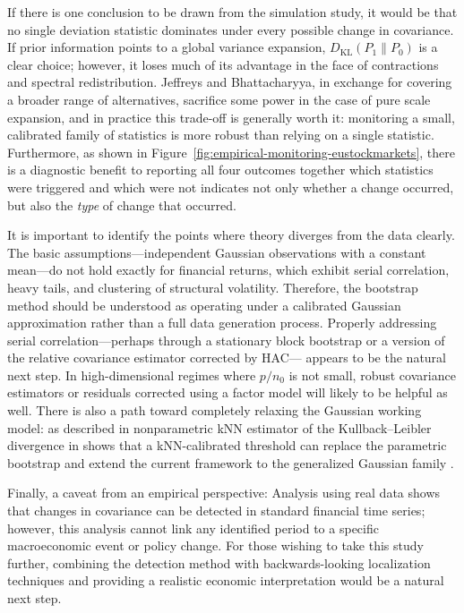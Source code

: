 \documentclass[11pt,a4paper]{article}
\newcommand{\KL}{\mathrm{KL}}
\begin{document}
If there is one conclusion to be drawn from the simulation study, it would be that no
single deviation statistic dominates under every possible change in covariance.
If prior information points to a global variance expansion, $D_{\KL}(P_{1}\|P_{0})$
is a clear choice; however, it loses much of its advantage in the face of
contractions and spectral redistribution. Jeffreys and Bhattacharyya,
in exchange for covering a broader range of alternatives, sacrifice some power
in the case of pure scale expansion, and in practice this trade-off is generally
worth it: monitoring a small, calibrated family of statistics
is more robust than relying on a single statistic. Furthermore,
as shown in Figure~\ref{fig:empirical-monitoring-eustockmarkets},
there is a diagnostic benefit to reporting all four outcomes together which statistics
were triggered and which were not indicates not only whether a change occurred,
but also the \emph{type} of change that occurred.

It is important to identify the points where theory diverges from the data clearly. The basic assumptions—independent Gaussian observations with a constant mean—do not hold exactly for financial returns, which exhibit
serial correlation, heavy tails, and clustering of structural volatility. Therefore, the bootstrap method should be understood as operating under a calibrated Gaussian
approximation rather than a full data generation process. Properly addressing
serial correlation—perhaps through a stationary block bootstrap or
a version of the relative covariance estimator corrected by HAC—
appears to be the natural next step. In high-dimensional regimes where $p/n_{0}$ is not small,
robust covariance estimators or residuals corrected using a factor model will
likely to be helpful as well. There is also a path toward
completely relaxing the Gaussian working model: as described in \citet{cadirci2026kl}
nonparametric kNN estimator of the Kullback–Leibler divergence in \citet{cadirci2026kl}
shows that a kNN-calibrated threshold can replace the parametric bootstrap and
extend the current framework to the generalized Gaussian family
\citep{cadirci2025tsallis}.

Finally, a caveat from an empirical perspective: Analysis using real data
shows that changes in covariance can be detected in standard financial time series; however, this analysis
cannot link any identified period to a specific
macroeconomic event or policy change. For those wishing to take this study further,
combining the detection method with backwards-looking
localization techniques and providing a realistic economic interpretation would be a natural
next step.
\end{document}
